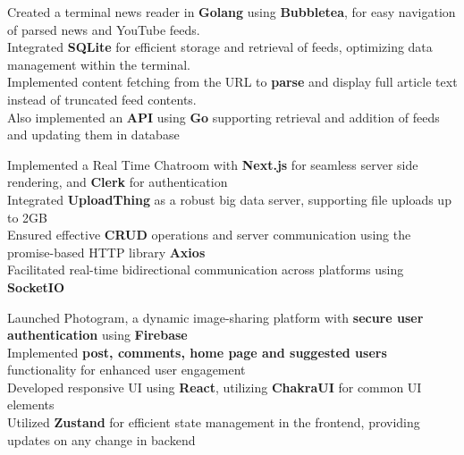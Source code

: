 \documentclass[]{Nikhil_Kadiyan_Resume}
\begin{document}
\pt Created a terminal news reader in \textbf{Golang} using \textbf{Bubbletea}, for easy navigation of parsed news and YouTube feeds.\\
\pt Integrated \textbf{SQLite} for efficient storage and retrieval of feeds, optimizing data management within the terminal. \\
\pt Implemented content fetching from the URL to \textbf{parse} and display full article text instead of truncated feed contents.\\
\pt Also implemented an \textbf{API} using \textbf{Go} supporting retrieval and addition of feeds and updating them in database\\
\sectionsep

\pt Implemented a Real Time Chatroom  with \textbf{Next.js} for seamless server side rendering, and \textbf{Clerk} for authentication\\
\pt Integrated \textbf{UploadThing} as a robust big data server, supporting file uploads up to 2GB\\
\pt Ensured effective \textbf{CRUD} operations and server communication using the promise-based HTTP library \textbf{Axios}\\
\pt Facilitated real-time bidirectional communication across platforms using \textbf{SocketIO}\\
\sectionsep

\pt Launched Photogram, a dynamic image-sharing platform with \textbf{secure user authentication} using \textbf{Firebase}\\
\pt Implemented \textbf{post, comments, home page and suggested users} functionality for enhanced user engagement \\
\pt Developed responsive UI using \textbf{React},  utilizing \textbf{ChakraUI} for common UI elements\\
\pt Utilized \textbf{Zustand} for efficient state management in the frontend, providing updates on any change in backend\\
\sectionsep
\end{document}
